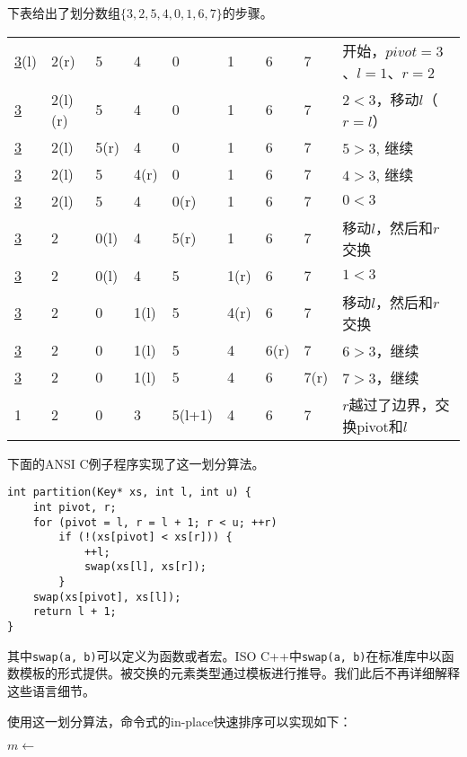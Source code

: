 \documentclass[UTF8]{article}
\begin{document}
下表给出了划分数组$\{ 3, 2, 5, 4, 0, 1, 6, 7\}$的步骤。

\begin{tabular}{|llllllll|l|}
\hline
\underline{3}(l)  & 2(r) & 5 & 4 & 0 & 1 & 6 & 7 & 开始，$pivot = 3$、$l = 1$、$r = 2$ \\
\underline{3} & 2(l)(r) & 5 & 4 & 0 & 1 & 6 & 7 & $2 < 3$，移动$l$（$r=l$）\\
\underline{3} & 2(l) & 5(r) & 4 & 0 & 1 & 6 & 7 & $5 > 3$, 继续 \\
\underline{3} & 2(l) & 5 & 4(r) & 0 & 1 & 6 & 7 & $4 > 3$, 继续 \\
\underline{3} & 2(l) & 5 & 4 & 0(r) & 1 & 6 & 7 & $0 < 3$ \\
\underline{3} & 2 & 0(l) & 4 & 5(r) & 1 & 6 & 7 & 移动$l$，然后和$r$交换 \\
\underline{3} & 2 & 0(l) & 4 & 5 & 1(r) & 6 & 7 & $1 < 3$ \\
\underline{3} & 2 & 0 & 1(l) & 5 & 4(r) & 6 & 7 & 移动$l$，然后和$r$交换 \\
\underline{3} & 2 & 0 & 1(l) & 5 & 4 & 6(r) & 7 & $6 > 3$，继续 \\
\underline{3} & 2 & 0 & 1(l) & 5 & 4 & 6 & 7(r) & $7 > 3$，继续 \\
1 & 2 & 0 & 3 & 5(l+1) & 4 & 6 & 7 & $r$越过了边界，交换pivot和$l$ \\
\hline
\end{tabular}

下面的ANSI C例子程序实现了这一划分算法。

\lstset{language=C}
\begin{lstlisting}
int partition(Key* xs, int l, int u) {
    int pivot, r;
    for (pivot = l, r = l + 1; r < u; ++r)
        if (!(xs[pivot] < xs[r])) {
            ++l;
            swap(xs[l], xs[r]);
        }
    swap(xs[pivot], xs[l]);
    return l + 1;
}
\end{lstlisting}

其中\texttt{swap(a, b)}可以定义为函数或者宏。ISO C++中\texttt{swap(a, b)}在标准库中以函数模板的形式提供。被交换的元素类型通过模板进行推导。我们此后不再详细解释这些语言细节。

使用这一划分算法，命令式的in-place快速排序可以实现如下：

\begin{algorithmic}[1]
    \State $m \gets$ 
    \State {}
    \State {}
  \EndIf
\EndProcedure
\end{algorithmic}
\end{document}
